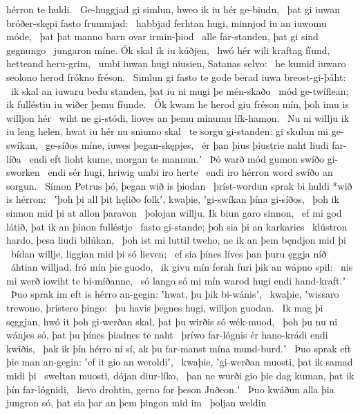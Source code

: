 hérron te huldi. \hld\ Ge-huggjad gi simlun,
hweo ik iu hér ge-biudu, \hld\ þat gi iuwan bróðer-skępi
fasto frummjad: \hld\ habbjad ferhtan hugi,
minnjod iu an iuwomu móde, \hld\ þat þat manno barn
ovar irmin-þiod \hld\ alle far-standen,
þat gi sind gegnungo \hld\ jungaron míne.
Ók skal ik iu kúðjen, \hld\ hwó hér wili kraftag fíund,
hetteand heru-grim, \hld\ umbi iuwan hugi niusien,
Satanas selvo: \hld\ he kumid iuwaro seolono herod
frókno fréson. \hld\ Simlun gi fasto te gode
berad iuwa breost-gi-þáht: \hld\ ik skal an iuwaru bedu standen,
þat iu ni mugi þe mén-skaðo \hld\ mód ge-twíflean;
ik fulléstiu iu wiðer þemu fíunde. \hld\ Ók kwam he herod giu fréson mín,
þoh imu is willjon hér \hld\ wiht ne gi-stódi,
lioves an þemu mínumu lík-hamon. \hld\ Nu ni willju ik iu leng helen,
hwat iu hér nu sniumo skal \hld\ te sorgu gi-standen:
gi skulun mi ge-swíkan, \hld\ ge-síðos míne,
iuwes þegan-skępjes, \hld\ ér þan þius þiustrie naht
liudi far-líða \hld\ endi eft lioht kume,
morgan te mannun.ʼ \hld\ Þó warð mód gumon
swíðo gi-sworken \hld\ endi sér hugi,
hriwig umbi iro herte \hld\ endi iro hérron word
swíðo an sorgun. \hld\ Símon Petrus þó,
þegan wið is þiodan \hld\ þríst-wordun sprak
bi huldi *wið is hérron: \hld\ ʽþoh þi all þit hęliðo folkʼ, kwaþie,
ʽgi-swíkan þína gi-síðos, \hld\ þoh ik sinnon mid þi
at allon þaravon \hld\ þolojan willju.
Ik biun garo sinnon, \hld\ ef mi god látið,
þat ik an þínon fulléstje \hld\ fasto gi-stande;
þoh sia þi an karkaries \hld\ klústron hardo,
þesa liudi bilúkan, \hld\ þoh ist mi luttil tweho,
ne ik an þem bęndjon mid þi \hld\ bídan willje,
liggian mid þi só lieven; \hld\ ef sia þínes líves þan
þuru ęggja níð \hld\ áhtian willjad,
fró mín þie guodo, \hld\ ik givu mín ferah furi þik
an wápno spil: \hld\ nis mi werð iowiht
te bi-míðanne, \hld\ só lango só mi mín warod
hugi endi hand-kraft.ʼ \hld\ Þuo sprak im eft is hérro an-gegin:
ʽhwat, þu þik bi-wánisʼ, \hld\ kwaþie, ʽwissaro trewono,
þrístero þingo: \hld\ þu havis þegnes hugi,
willjon guodan. \hld\ Ik mag þi sęggjan, hwó it þoh gi-werðan skal,
þat þu wirðis só wék-muod, \hld\ þoh þu nu ni wánjes só,
þat þu þínes þiadnes te naht \hld\ þríwo far-lógnis
ér hano-krádi endi kwiðis, \hld\ þak ik þín hérro ni sí,
ak þu far-manst mína mund-burd.ʼ \hld\ Þuo sprak eft þie man an-gegin:
ʽef it gio an weroldiʼ, \hld\ kwaþie, ʽgi-werðan muosti,
þat ik samad midi þi \hld\ sweltan muosti,
dójan diur-líko, \hld\ þan ne wurði gio þie dag kuman,
þat ik þín far-lógnidi, \hld\ lievo drohtin,
gerno for þeson Juðeon.ʼ \hld\ Þuo kwáðun alla þia jungron só,
þat sia þar an þem þingon mid im \hld\ þoljan weldin
